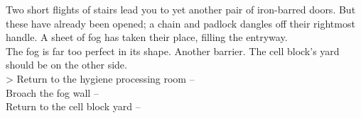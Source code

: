 Two short flights of stairs lead you to yet another pair of iron-barred doors. But these have already been opened; a chain and padlock dangles off their rightmost handle. A sheet of fog has taken their place, filling the entryway.\\

The fog is far too perfect in its shape. Another barrier. The cell block’s yard should be on the other side.\\

> Return to the hygiene processing room -- \\
 Broach the fog wall -- \\
 Return to the cell block yard -- 